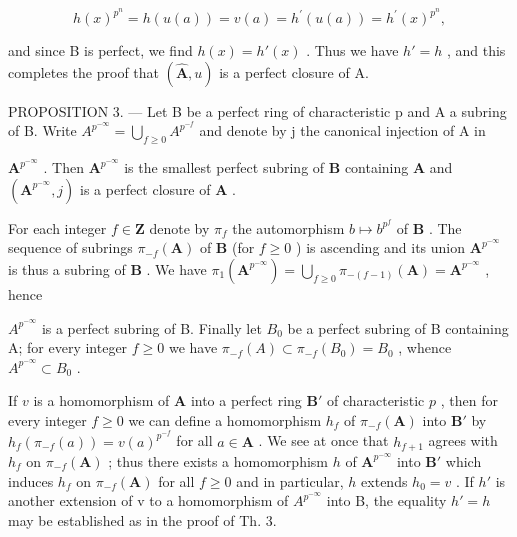 \[
h (x) ^ {p ^ {n}} = h (u (a)) = v (a) = h ^ {\prime} (u (a)) = h ^ {\prime} (x) ^ {p ^ {n}},
\]

and since B is perfect, we find \(h(x) = h'(x)\) . Thus we have \(h' = h\) , and this completes the proof that \((\hat{\mathbf{A}}, u)\) is a perfect closure of A.

PROPOSITION 3. --- Let B be a perfect ring of characteristic p and A a subring of B. Write \(A^{p^{-\infty}} = \bigcup_{f \geqslant 0} A^{p^{-f}}\) and denote by j the canonical injection of A in

\(\mathbf{A}^{p^{-\infty}}\) . Then \(\mathbf{A}^{p^{-\infty}}\) is the smallest perfect subring of \(\mathbf{B}\) containing \(\mathbf{A}\) and \((\mathbf{A}^{p^{-\infty}}, j)\) is a perfect closure of \(\mathbf{A}\) .

For each integer \(f \in \mathbf{Z}\) denote by \(\pi_f\) the automorphism \(b \mapsto b^{p^f}\) of \(\mathbf{B}\) . The sequence of subrings \(\pi_{-f}(\mathbf{A})\) of \(\mathbf{B}\) (for \(f \geqslant 0\) ) is ascending and its union \(\mathbf{A}^{p^{-\infty}}\) is thus a subring of \(\mathbf{B}\) . We have \(\pi_1(\mathbf{A}^{p^{-\infty}}) = \bigcup_{f \geqslant 0} \pi_{-(f-1)}(\mathbf{A}) = \mathbf{A}^{p^{-\infty}}\) , hence

\(A^{p^{-\infty}}\) is a perfect subring of B. Finally let \(B_0\) be a perfect subring of B containing A; for every integer \(f \geqslant 0\) we have \(\pi_{-f}(A) \subset \pi_{-f}(B_0) = B_0\) , whence \(A^{p^{-\infty}} \subset B_0\) .

If \(v\) is a homomorphism of \(\mathbf{A}\) into a perfect ring \(\mathbf{B}'\) of characteristic \(p\) , then for every integer \(f \geqslant 0\) we can define a homomorphism \(h_f\) of \(\pi_{-f}(\mathbf{A})\) into \(\mathbf{B}'\) by \(h_f(\pi_{-f}(a)) = v(a)^{p^{-f}}\) for all \(a \in \mathbf{A}\) . We see at once that \(h_{f + 1}\) agrees with \(h_f\) on \(\pi_{-f}(\mathbf{A})\) ; thus there exists a homomorphism \(h\) of \(\mathbf{A}^{p^{-\infty}}\) into \(\mathbf{B}'\) which induces \(h_f\) on \(\pi_{-f}(\mathbf{A})\) for all \(f \geqslant 0\) and in particular, \(h\) extends \(h_0 = v\) . If \(h'\) is another extension of v to a homomorphism of \(A^{p^{-\infty}}\) into B, the equality \(h' = h\) may be established as in the proof of Th. 3.

